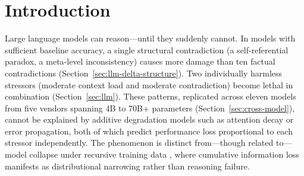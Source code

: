 \documentclass[11pt,a4paper]{article}
\begin{document}
\begin{abstract}
The exponential penalty $e^{-\delta}$ is a mathematical identity with the first moment of the SAT solution count, not an approximation. Extension to the second moment method (Paley--Zygmund inequality) quantitatively explains 74\% of the gap between the first-moment upper bound and the true 3-SAT threshold; the remaining 26\% is attributable to replica symmetry breaking. All results---including the second moment overlap decomposition, multi-attractor transition theorems, weak dependence bounds ($e^{-\delta(1+\rho)} \leq P \leq e^{-\delta(1-\rho)}$), and Cauchy uniqueness of the exponential form---are machine-verified in Lean~4 with no \texttt{sorry} and no \texttt{axiom}.

\medskip
\noindent\textbf{Keywords:} LLM reasoning collapse, structural contradiction, information loss, multiplicative model, SAT phase transition, survival analysis, multi-attractor transition, formal verification
\end{abstract}

\section{Introduction}

Large language models can reason---until they suddenly cannot. In models with sufficient baseline accuracy, a single structural contradiction (a self-referential paradox, a meta-level inconsistency) causes more damage than ten factual contradictions (Section~\ref{sec:llm-delta-structure}). Two individually harmless stressors (moderate context load and moderate contradiction) become lethal in combination (Section~\ref{sec:llm}). These patterns, replicated across eleven models from five vendors spanning 4B to 70B+ parameters (Section~\ref{sec:cross-model}), cannot be explained by additive degradation models such as attention decay or error propagation, both of which predict performance loss proportional to each stressor independently. The phenomenon is distinct from---though related to---model collapse under recursive training data \citep{shumailov2024}, where cumulative information loss manifests as distributional narrowing rather than reasoning failure.
\end{document}
